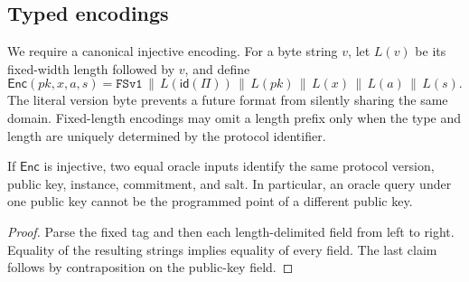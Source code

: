 \subsection{Typed encodings}
\label{sec:syntax}

We require a canonical injective encoding.  For a byte string $v$, let
$L(v)$ be its fixed-width length followed by $v$, and define
\begin{equation}
  \label{eq:encoding}
  \mathsf{Enc}(pk,x,a,s)
  = \mathtt{FSv1}\,\|\,L(\mathsf{id}(\Pi))\,\|\,L(pk)\,\|\,L(x)\,\|\,L(a)\,\|\,L(s).
\end{equation}
The literal version byte prevents a future format from silently sharing the
same domain.  Fixed-length encodings may omit a length prefix only when the
type and length are uniquely determined by the protocol identifier.

\begin{lemma}
  \label{lem:domains}
  If $\mathsf{Enc}$ is injective, two equal oracle inputs identify the same
  protocol version, public key, instance, commitment, and salt.  In particular,
  an oracle query under one public key cannot be the programmed point of a
  different public key.
\end{lemma}

\begin{proof}
  Parse the fixed tag and then each length-delimited field from left to right.
  Equality of the resulting strings implies equality of every field.  The last
  claim follows by contraposition on the public-key field.
\end{proof}
